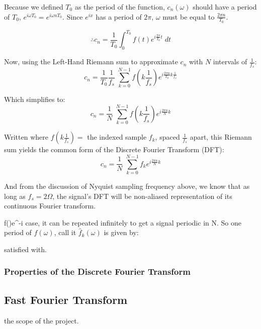 \documentclass[12pt]{article}
\begin{document}
Because we defined \(T_0\) as the period of the function, \(c_{n}(\omega) \) 
should have a period of \( T_0\), \(e^{i\omega T_0} = e^{i\omega nT_0}\). Since 
\(e^{i x}\) has a period of \( 2\pi \), \( \omega \) must be equal to 
\(\frac{2\pi n}{T_0} \). 

\[ \therefore c_{n} = \frac{1}{T_0} \int_{0}^{T_0} f(t) e^{i \frac{2\pi}{T_0} t 
} \; dt\] 

Now, using the Left-Hand Riemann sum to approximate \( c_n\) with \( N\) 
intervals of \( \frac{1}{f_s} \):
\[ c_{n} = \frac{1}{T_0} \frac{1}{f_s} \; \sum_{k = 0}^{N-1} f(k \frac{1}{f_s}) 
e^{i \frac{2\pi n}{T_0} k\frac{1}{f_s}} \]

Which simplifies to:
\[ c_{n} = \frac{1}{N} \; \sum_{k = 0}^{N-1} f(k \frac{1}{f_s}) e^{i \frac{2\pi 
n}{N}k} \]

Written where \( f(k \frac{1}{f_s}) =\) the indexed sample \(f_k\), spaced 
\(\frac{1}{f_s}\) apart, this Riemann sum yields the common form of the 
Discrete Fourier Transform (DFT):
\[ c_{n} = \frac{1}{N} \; \sum_{k = 0}^{N-1} f_k e^{i \frac{2\pi n}{N}k} \]

And from the discussion of Nyquist sampling frequency above, we know that as 
long as \(f_s = 2\Omega\), the signal's DFT will be non-aliased representation 
of its continuous Fourier transform.

f()e^{-i \omega {} } \]
%
case, it can be repeated infinitely to get a signal periodic in N. So one 
period of \(\hat{f}(\omega) \), call it \(\hat{f}_{k}(\omega) \) is given by:
%

satisfied with. 

\subsubsection{Properties of the Discrete Fourier Transform}


\subsection{Fast Fourier Transform}
the scope of the project.
\end{document}
